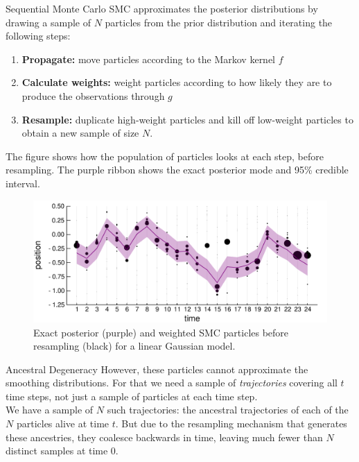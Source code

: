 \documentclass[final, 12pt]{beamer}
\newlength{\colwidth}
\begin{document}
\begin{frame}
\begin{columns}
\begin{column}{\colwidth}
\begin{block}{Sequential Monte Carlo}
SMC approximates the posterior distributions by drawing a sample of $N$ particles from the prior distribution and iterating the following steps:
\begin{enumerate}
\item \textbf{Propagate:} move particles according to the Markov kernel $f$
\item \textbf{Calculate weights:} weight particles according to how likely they are to produce the observations through $g$
\item \textbf{Resample:} duplicate high-weight particles and kill off low-weight particles to obtain a new sample of size $N$.
\end{enumerate}

\vspace*{10pt}

The figure shows how the population of particles looks at each step, before resampling. The purple ribbon shows the exact posterior mode and 95\% credible interval.
\begin{figure}
\includegraphics[width=\colwidth]{smc_kalman.pdf}
\caption{Exact posterior (purple) and weighted SMC particles before resampling (black) for a linear Gaussian model.}
\end{figure}
\end{block}

\begin{block}{Ancestral Degeneracy}
However, these particles cannot approximate the smoothing distributions. For that we need a sample of \emph{trajectories} covering all $t$ time steps, not just a sample of particles at each time step.\\[10pt]

We have a sample of $N$ such trajectories: the ancestral trajectories of each of the $N$ particles alive at time $t$.
But due to the resampling mechanism that generates these ancestries, they coalesce backwards in time, leaving much fewer than $N$ distinct samples at time 0. 


\end{block}
\end{column}
\end{columns}
\end{frame}
\end{document}
